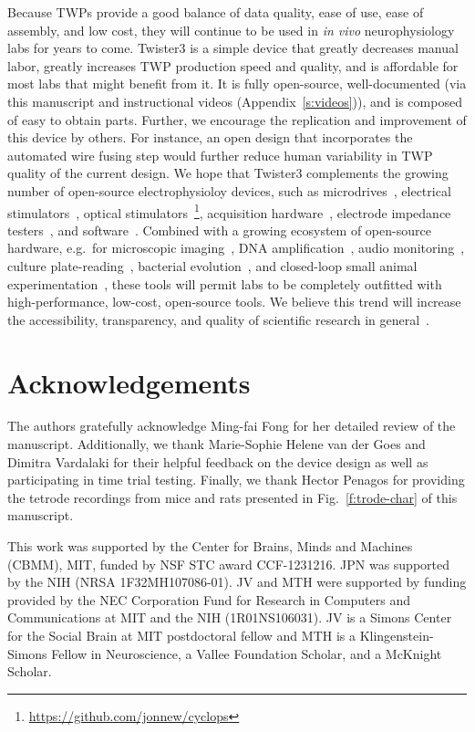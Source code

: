 \documentclass[11pt,a4paper]{article}
\begin{document}
Because TWPs provide a good balance of data quality, ease of use, ease of
assembly, and low cost, they will continue to be used in \textit{in vivo}
neurophysiology labs for years to come. Twister3 is a simple device that
greatly decreases manual labor, greatly increases TWP production speed and
quality, and is affordable for most labs that might benefit from it. It is
fully open-source, well-documented (via this manuscript and instructional
videos (Appendix~\ref{s:videos})), and is composed of easy to obtain parts.
Further, we encourage the replication and improvement of this device by others.
For instance, an open design that incorporates the automated wire fusing step
would further reduce human variability in TWP quality of the current design. We
hope that Twister3 complements the growing number of open-source
electrophysioloy devices, such as
microdrives~\cite{Kloosterman2009,Voigts2013}, electrical
stimulators~\cite{Cermak2019}, optical
stimulators~\cite{Newman2015}\footnote{\url{https://github.com/jonnew/cyclops}},
acquisition hardware~\cite{Siegle2017}, electrode impedance
testers~\cite{Matsumoto2019}, and software~\cite{Newman2012b, Siegle2017,
Lopes2015}. Combined with a growing ecosystem of open-source hardware, e.g.\
for microscopic imaging~\cite{Cai2016,Voigt2019,MIMMS}, DNA
amplification~\cite{OpenPCR}, audio monitoring~\cite{Hill2018}, culture
plate-reading~\cite{Szymula2019}, bacterial evolution~\cite{Takahashi2015}, and
closed-loop small animal experimentation~\cite{Maia2017,Moreira2019}, these
tools will permit labs to be completely outfitted with high-performance,
low-cost, open-source tools. We believe this trend will increase the
accessibility, transparency, and quality of scientific research in
general~\cite{Siegle2015}.

\section*{Acknowledgements}
The authors gratefully acknowledge Ming-fai Fong for her detailed review of the
manuscript. Additionally, we thank Marie-Sophie Helene van der Goes and Dimitra
Vardalaki for their helpful feedback on the device design as well as
participating in time trial testing. Finally, we thank Hector Penagos for
providing the tetrode recordings from mice and rats presented in
Fig.~\ref{f:trode-char} of this manuscript.

This work was supported by the Center for Brains, Minds and Machines (CBMM),
MIT, funded by NSF STC award CCF-1231216. JPN was supported by the NIH (NRSA
1F32MH107086-01). JV and MTH were supported by funding provided by the NEC
Corporation Fund for Research in Computers and Communications at MIT and the
NIH (1R01NS106031). JV is a Simons Center for the Social Brain at MIT
postdoctoral fellow and MTH is a Klingenstein-Simons Fellow in Neuroscience, a
Vallee Foundation Scholar, and a McKnight Scholar. 
\end{document}
